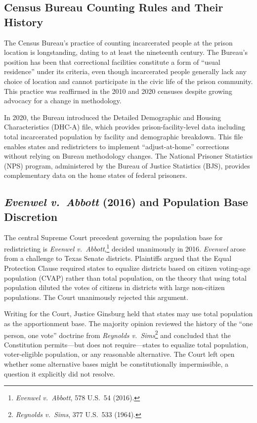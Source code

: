 \label{sec:background}

\subsection{Census Bureau Counting Rules and Their History}

The Census Bureau's practice of counting incarcerated people at the prison
location is longstanding, dating to at least the nineteenth century.
The Bureau's position has been that correctional facilities constitute a
form of ``usual residence'' under its criteria, even though incarcerated
people generally lack any choice of location and cannot participate in the
civic life of the prison community. This practice was reaffirmed in the
2010 and 2020 censuses despite growing advocacy for a change in methodology.

In 2020, the Bureau introduced the Detailed Demographic and Housing
Characteristics (DHC-A) file, which provides prison-facility-level data
including total incarcerated population by facility and demographic
breakdown. This file enables states and redistricters to implement
``adjust-at-home'' corrections without relying on Bureau methodology
changes. The National Prisoner Statistics (NPS) program, administered
by the Bureau of Justice Statistics (BJS), provides complementary data
on the home states of federal prisoners.

\subsection{\textit{Evenwel v.\ Abbott} (2016) and Population Base Discretion}

The central Supreme Court precedent governing the population base for
redistricting is \textit{Evenwel v.\ Abbott},\footnote{\textit{Evenwel
v.\ Abbott}, 578 U.S.\ 54 (2016).} decided unanimously in 2016.
\textit{Evenwel} arose from a challenge to Texas Senate districts.
Plaintiffs argued that the Equal Protection Clause required states to
equalize districts based on citizen voting-age population (CVAP) rather
than total population, on the theory that using total population
diluted the votes of citizens in districts with large non-citizen
populations. The Court unanimously rejected this argument.

Writing for the Court, Justice Ginsburg held that states may use total
population as the apportionment base. The majority opinion reviewed the
history of the ``one person, one vote'' doctrine from \textit{Reynolds v.\
Sims}\footnote{\textit{Reynolds v.\ Sims}, 377 U.S.\ 533 (1964).} and
concluded that the Constitution permits---but does not require---states
to equalize total population, voter-eligible population, or any
reasonable alternative. The Court left open whether some alternative
bases might be constitutionally impermissible, a question it explicitly
did not resolve.

